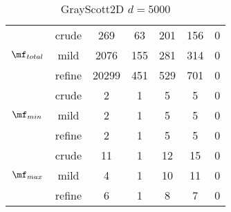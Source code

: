 \begin{table}[htb]
\begin{tabular}{ |c|c|c|c|c|c|c| }
\hline
  & crude & 269 & 63 & 201 & 156 & 0 \\
 $\mf_{total}$  & mild & 2076 & 155 & 281 & 314 & 0 \\
  & refine & 20299 & 451 & 529 & 701 & 0 \\
\hline
  & crude & 2 & 1 & 5 & 5 & 0 \\
 $\mf_{min}$  & mild & 2 & 1 & 5 & 5 & 0 \\
  & refine & 2 & 1 & 5 & 5 & 0 \\
\hline
  & crude & 11 & 1 & 12 & 15 & 0 \\
 $\mf_{max}$  & mild & 4 & 1 & 10 & 11 & 0 \\
  & refine & 6 & 1 & 8 & 7 & 0 \\
\hline
\end{tabular}
\caption{ GrayScott2D $d=5000$ }
\end{table}
